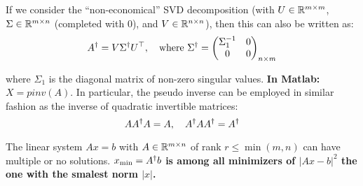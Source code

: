 \noindent
If we consider the ``non-economical'' SVD decomposition
(with $U \in \mathbb{R}^{m \times{} m}$, $\Sigma \in \mathbb{R}^{m \times{} n}$ (completed with 0), and $V \in \mathbb{R}^{n \times{} n}$),
then this can also be written as:
	\[A^{\dagger} = V \Sigma^{\dagger} U^{\top}, \quad
		\text{where}\ \Sigma^{\dagger} =
		\begin{pmatrix}
			\Sigma_1^{-1} & 0 \\
			0 & 0
		\end{pmatrix}_{n \times m}\]

\noindent
where $\Sigma_1$ is the diagonal matrix of non-zero singular values.
\textbf{In Matlab:} $X = pinv(A)$.
In particular, the pseudo inverse can be employed in similar fashion
as the inverse of quadratic invertible matrices:
	\[A A^{\dagger} A = A, \quad A^{\dagger} A A^{\dagger} = A^{\dagger}\]

\noindent
The linear system $Ax = b$ with $A \in \mathbb{R}^{m \times{} n}$ of rank $r \le \min(m,n)$
can have multiple or no solutions.
$x_{\min} = A^{\dagger}b$ \textbf{is among all minimizers of $|Ax-b|^2$
the one with the smalest norm $|x|$.}
